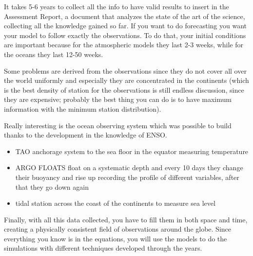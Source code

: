 It takes 5-6 years to collect all the info to have valid results to insert in the Assessment Report, a document that analyzes the state of the art of the science, collecting all the knowledge gained so far. 
If you want to do forecasting you want your model to follow exactly the observations. To do that, your initial conditions are important because for the atmospheric models they last 2-3 weeks, while for the oceans they last 12-50 weeks. 

Some problems are derived from the observations since they do not cover all over the world uniformly and especially they are concentrated in the continents (which is the best density of station for the observations is still endless discussion, since they are expensive; probably the best thing you can do is to have maximum information with the minimum station distribution). 

Really interesting is the ocean observing system which was possible to build thanks to the development in the knowledge of ENSO. 
\begin{itemize}
    \item TAO anchorage system to the sea floor in the equator measuring temperature
    \item  ARGO FLOATS float on a systematic depth and every 10 days they change their buoyancy and rise up recording the profile of different variables, after that they go down again 
    \item tidal station across the coast of the continents to measure sea level 
\end{itemize}

Finally, with all this data collected, you have to fill them in both space and time, creating a physically consistent field of observations around the globe. Since everything you know is in the equations, you will use the models to do the simulations with different techniques developed through the years. 


